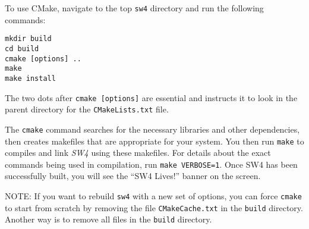 \documentclass[11pt]{article}
\begin{document}
To use CMake, navigate to the top {\tt sw4} directory and run the following commands:
\begin{verbatim}
mkdir build
cd build
cmake [options] ..
make
make install
\end{verbatim}

The two dots after {\tt cmake [options]} are essential and instructs it to look in the parent
directory for the {\tt CMakeLists.txt} file.
 
The \verb+cmake+ command searches for the necessary libraries and other dependencies, then creates
makefiles that are appropriate for your system. You then run \verb+make+ to compiles and link
\emph{SW4} using these makefiles. For details about the exact commands being used in compilation,
run \texttt{make VERBOSE=1}.  Once SW4 has been successfully built, you will see the
``SW4 Lives!'' banner on the screen.

NOTE: If you want to rebuild \verb+sw4+ with a new set of options, you can force \verb+cmake+ to start
from scratch by removing the file \verb+CMakeCache.txt+ in the \verb+build+ directory. Another way
is to remove all files in the \verb+build+ directory.
\end{document}
